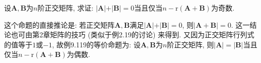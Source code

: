 \documentclass[../../main.tex]{subfiles}%
\begin{document}
\begin{proposition}\label{proposition:两正交矩阵的和的秩与n的差为奇数则行列式和为0}
设\(\boldsymbol{A},\boldsymbol{B}\)为\(n\)阶正交矩阵, 求证: \(\vert\boldsymbol{A}\vert+\vert\boldsymbol{B}\vert = 0\)当且仅当\(n-\mathrm{r}(\boldsymbol{A}+\boldsymbol{B})\)为奇数.
\end{proposition}
\begin{remark}
这个命题的直接推论是: 若正交矩阵\(\boldsymbol{A},\boldsymbol{B}\)满足\(\vert\boldsymbol{A}\vert+\vert\boldsymbol{B}\vert = 0\), 则\(\vert\boldsymbol{A}+\boldsymbol{B}\vert = 0\). 这一结论也可由第2章矩阵的技巧 (类似于例2.19的讨论) 来得到. 又因为正交矩阵行列式的值等于\(1\)或\(-1\), 故例9.119的等价命题为: 设\(\boldsymbol{A},\boldsymbol{B}\)为\(n\)阶正交矩阵, 则\(\vert\boldsymbol{A}\vert = \vert\boldsymbol{B}\vert\)当且仅当\(n-\mathrm{r}(\boldsymbol{A}+\boldsymbol{B})\)为偶数.
\end{remark}
\end{document}
